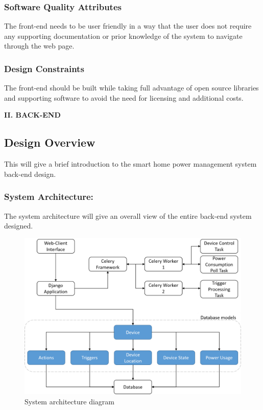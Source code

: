 \documentclass[10pt,twocolumn]{witseiepaper}
\begin{document}
	\subsubsection{Software Quality Attributes}
	The front-end needs to be user friendly in a way that the user does not require any supporting documentation or prior knowledge of the system to navigate through the web page.
	\subsubsection{Design Constraints}
	The front-end should be built while taking full advantage of open source libraries and supporting software to avoid the need for licensing and additional costs.

	\newpage
	\begin{center}
		\textbf{II. BACK-END}
	\end{center}
	
	\subsection{Design Overview}
	This will give a brief introduction to the smart home power management system back-end design. 
	
	\subsubsection{System Architecture:}
	The system architecture will give an overall view of the entire back-end system designed. 
	
	\begin{figure}[H]
		\centering
		\includegraphics[width=\linewidth]{Sys_Overview}
		\caption{System architecture diagram}
		\label{fig:Sys_Overview}
	\end{figure}
	
\end{document}
